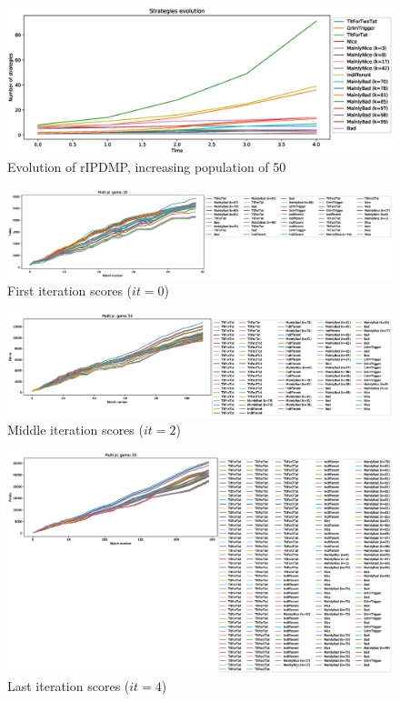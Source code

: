 \documentclass[journal,a4paper,10pt,twoside]{IEEEtran} %
\begin{document}
\begin{figure}[!ht]
    \centering
    \includegraphics[width=1\columnwidth]{../img/ripdmp-incr/ripdmp-evolution-increasing-pop-50}
    \caption{Evolution of rIPDMP, increasing population of 50}
    \label{fig:incrR}
\end{figure}

\begin{figure}[!ht]
    \centering
    \includegraphics[width=1\columnwidth]{../img/ripdmp-incr/ripdmp-scores-increasing-pop-50-r0}
    \caption{First iteration scores ($it=0$)}
    \label{fig:incrFI}
\end{figure}

\begin{figure}[!ht]
    \centering
    \includegraphics[width=1\columnwidth]{../img/ripdmp-incr/ripdmp-scores-increasing-pop-50-r2}
    \caption{Middle iteration scores ($it=2$)}
    \label{fig:incrMI}
\end{figure}

\begin{figure}[!ht]
    \centering
    \includegraphics[width=1\columnwidth]{../img/ripdmp-incr/ripdmp-scores-increasing-pop-50-r4}
    \caption{Last iteration scores ($it=4$)}
    \label{fig:incrLI}
\end{figure}
\end{document}
